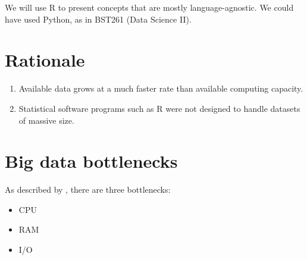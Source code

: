 \documentclass[]{book}
\providecommand{\tightlist}{%
  \setlength{\itemsep}{0pt}\setlength{\parskip}{0pt}}
\theoremstyle{definition}
\theoremstyle{definition}
\theoremstyle{definition}
\theoremstyle{remark}
\begin{document}
We will use R to present concepts that are mostly language-agnostic. We
could have used Python, as in BST261 (Data Science II).

\section{Rationale}\label{rationale}

\begin{enumerate}
\def\labelenumi{\arabic{enumi}.}
\item
  Available data grows at a much faster rate than available computing
  capacity.
\item
  Statistical software programs such as R were not designed to handle
  datasets of massive size.
\end{enumerate}

\section{Big data bottlenecks}\label{big-data-bottlenecks}

As described by \citet{Lim2015}, there are three bottlenecks:

\begin{itemize}
\tightlist
\item
  CPU
\item
  RAM
\item
  I/O
\end{itemize}
\end{document}
